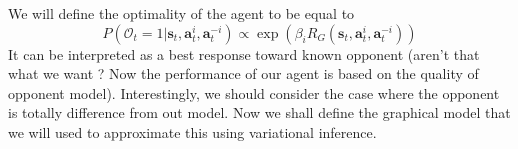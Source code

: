 We will define the optimality of the agent to be equal to
\begin{equation}
    P(\mathcal{O}_{t} = 1 | \boldsymbol{s}_{t}, \boldsymbol{a}^i_{t}, \boldsymbol{a}^{-i}_{t}) \propto \exp\left( \beta_i R_G(\boldsymbol{s}_{t}, \boldsymbol{a}^i_{t}, \boldsymbol{a}^{-i}_{t}) \right)
\end{equation}
It can be interpreted as a best response toward known opponent (aren't that what we want ? Now the performance of our agent is based on the quality of opponent model). Interestingly, we should consider the case where the opponent is totally difference from out model. Now we shall define the graphical model that we will used to approximate this using variational inference.
\begin{figure}[H]
    \begin{minipage}[t]{0.5\linewidth}
    \centering
    \end{minipage}%
    \begin{minipage}[t]{0.5\linewidth}
    \end{minipage}
\end{figure}

